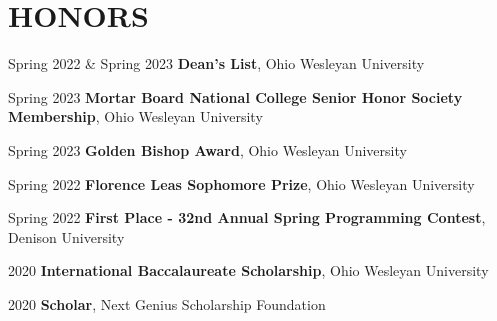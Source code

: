 \documentclass[10pt, letterpaper]{article}
\begin{document}
\section{HONORS}

\begin{honorentry}
    {Spring 2022 \& Spring 2023} %
    {\textbf{Dean's List}, Ohio Wesleyan University} %
\end{honorentry}

\begin{honorentry}
    {Spring 2023} %
    {\textbf{Mortar Board National College Senior Honor Society Membership}, Ohio Wesleyan University} %
\end{honorentry}

\begin{honorentry}
    {Spring 2023} %
    {\textbf{Golden Bishop Award}, Ohio Wesleyan University} %
\end{honorentry}

\begin{honorentry}
    {Spring 2022} %
    {\textbf{Florence Leas Sophomore Prize}, Ohio Wesleyan University} %
\end{honorentry}

\begin{honorentry}
    {Spring 2022} %
    {\textbf{First Place - 32nd Annual Spring Programming Contest}, Denison University} %
\end{honorentry}

\begin{honorentry}
    {2020} %
    {\textbf{International Baccalaureate Scholarship}, Ohio Wesleyan University} %
\end{honorentry}

\begin{honorentry}
    {2020} %
    {\textbf{Scholar}, Next Genius Scholarship Foundation} %
\end{honorentry}
\end{document}
